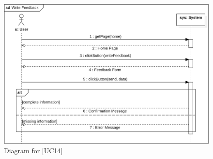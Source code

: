 \begin{figure} [H]
    \centering
    \includegraphics[width=1\linewidth]{Use Cases Images/write_feedback.png}
    \caption{Diagram for [UC14]}
    \label{fig: Write Feedback Diagram}
\end{figure}

